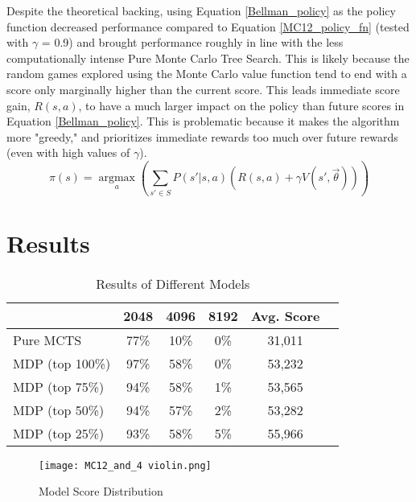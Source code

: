 \documentclass{article}
\DeclareMathOperator*{\argmax}{argmax}
\begin{document}
Despite the theoretical backing, using Equation \ref{Bellman_policy} as the policy function decreased performance compared to Equation \ref{MC12_policy_fn} (tested with $\gamma$ = 0.9) and brought performance roughly in line with the less computationally intense Pure Monte Carlo Tree Search.  This is likely because the random games explored using the Monte Carlo value function tend to end with a score only marginally higher than the current score.  This leads immediate score gain, $R(s, a)$, to have a much larger impact on the policy than future scores in Equation \ref{Bellman_policy}.  This is problematic because it makes the algorithm more "greedy," and prioritizes immediate rewards too much over future rewards (even with high values of $\gamma$).
\begin{equation}
\label{Bellman_policy}
\pi(s) = \argmax\limits_{a}\left( \sum\limits_{s' \in S} P(s'|s, a)(R(s,a) + \gamma V(s', \vec{\theta})) \right)
\end{equation}


\section{Results}

\begin{table}[h]
  \caption{Results of Different Models}
  \begin{tabular}{|l|c|c|c|c|c|}
    \hline
    & 2048 & 4096 & 8192 & Avg. Score \\
    \hline
    Pure MCTS & 77\% & 10\% & 0\% & 31,011 \\
    \hline
    MDP (top 100\%) & \cellcolor{green!25}97\% & \cellcolor{green!25}58\% & 0\% & 53,232\\
    \hline
    MDP (top 75\%) & 94\% & \cellcolor{green!25}58\% & 1\% & 53,565\\
    \hline
    MDP (top 50\%) & 94\% & 57\% & 2\% & 53,282\\
    \hline
    MDP (top 25\%) & 93\% & \cellcolor{green!25}58\% & \cellcolor{green!25}5\% & \cellcolor{green!25}55,966 \\
    \hline
  \end{tabular}
\end{table}

\begin{figure}[H]
\centering
\texttt{[image: MC12\_and\_4 violin.png]}
\caption{Model Score Distribution}
\label{fig:violin1}
\end{figure}
\end{document}
